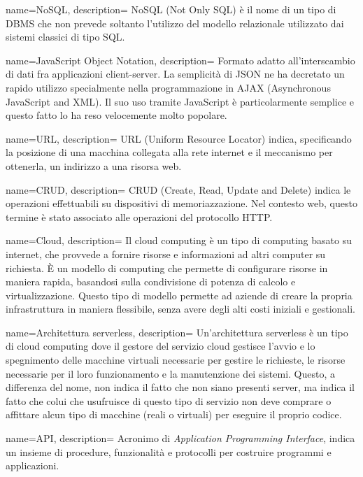  {
  name=NoSQL,
  description={
NoSQL (Not Only SQL) è il nome di un tipo di DBMS che non prevede soltanto
l'utilizzo del modello relazionale utilizzato dai sistemi classici di tipo SQL.
}
}

 {
  name=JavaScript Object Notation,
  description={
Formato adatto all’interscambio di dati fra applicazioni client-server. La
semplicità di JSON ne ha decretato un rapido utilizzo specialmente nella
programmazione in AJAX (Asynchronous JavaScript and XML). Il suo uso tramite
JavaScript è particolarmente semplice e questo fatto lo ha reso velocemente
molto popolare.
}
}

 {
  name=URL,
  description={
URL (Uniform Resource Locator) indica, specificando la posizione di una macchina
collegata alla rete internet e il meccanismo per ottenerla, un indirizzo a una
risorsa web.
}
}

 {
  name=CRUD,
  description={
CRUD (Create, Read, Update and Delete) indica le operazioni effettuabili su
dispositivi di memoriazzazione. Nel contesto web, questo termine è stato
associato alle operazioni del protocollo HTTP.
}
}

 {
  name=Cloud,
  description={
Il cloud computing è un tipo di computing basato su internet, che provvede a
fornire risorse e informazioni ad altri computer su richiesta. È un modello di
computing che permette di configurare risorse in maniera rapida, basandosi
sulla condivisione di potenza di calcolo e virtualizzazione. Questo tipo di
modello permette ad aziende di creare la propria infrastruttura in maniera
flessibile, senza avere degli alti costi iniziali e gestionali.
}
}

 {
  name=Architettura serverless,
  description={
Un'architettura serverless è un tipo di cloud computing dove il gestore del
servizio cloud gestisce l'avvio e lo spegnimento delle macchine virtuali
necessarie per gestire le richieste, le risorse necessarie per il loro
funzionamento e la manutenzione dei sistemi. Questo, a differenza del nome, non
indica il fatto che non siano presenti server, ma indica il fatto che colui che
usufruisce di questo tipo di servizio non deve comprare o affittare alcun tipo
di macchine (reali o virtuali) per eseguire il proprio codice.
}
}

 {
  name=API,
  description={
Acronimo di \textit{Application Programming Interface}, indica un insieme
di procedure, funzionalità e protocolli per costruire programmi e applicazioni.
}
}

